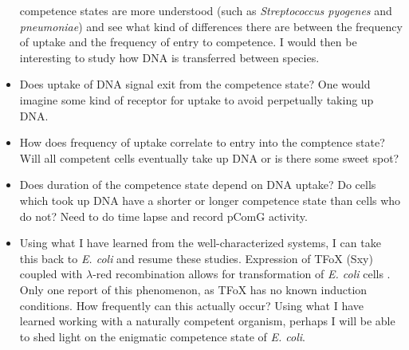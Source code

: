 \begin{itemize}
		competence states are more understood (such as
		\textit{Streptococcus pyogenes} and \textit{pneumoniae}) and see
		what kind of differences there are between the frequency of
		uptake and the frequency of entry to competence. I would then be
		interesting to study how DNA is transferred between species.
	\item Does uptake of DNA signal exit from the competence state? One
		would imagine some kind of receptor for uptake to avoid
		perpetually taking up DNA.	
	\item How does frequency of uptake correlate to entry into the comptence
		state? Will all competent cells eventually take up DNA or is
		there some sweet spot? 
	\item Does duration of the competence state depend on DNA uptake? Do
		cells which took up DNA have a shorter or longer competence
		state than cells who do not? Need to do time lapse and record
		pComG activity. 
	\item Using what I have learned from the well-characterized systems, I
		can take this back to \textit{E. coli} and resume these studies.
		Expression of TFoX (Sxy) coupled with $\lambda$-red
		recombination allows for transformation of \textit{E. coli}
		cells \cite{Sinha:2012eh}. Only one report of this phenomenon,
		as TFoX has no known induction conditions. How frequently can
		this actually occur? Using what I have learned working with a
		naturally competent organism, perhaps I will be able to shed
		light on the enigmatic competence state of \textit{E. coli}.
 
\end{itemize}

